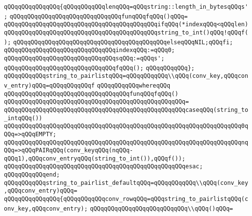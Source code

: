 \verb|qQQqqQQqqQQqqQQq{qQQqqQQqqQQqlenqQQq=qQQqstring::length_in_bytesqQQqs';|\newline
\verb|qQQqqQQqqQQqqQQqqQQqqQQqqQQqqQQqfunqQQqfqQQq()qQQq=|\newline
\verb|qQQqqQQqqQQqqQQqqQQqqQQqqQQqqQQqqQQqqQQqqQQqifqQQq(*indexqQQq<qQQqlen)|\newline
\verb|qQQqqQQqqQQqqQQqqQQqqQQqqQQqqQQqqQQqqQQqqQQqstring_to_int()qQQq!qQQqf();|\newline
\verb|qQQqqQQqqQQqqQQqqQQqqQQqqQQqqQQqqQQqqQQqqQQqelseqQQqNIL;qQQqfi;|\newline
\verb|qQQqqQQqqQQqqQQqqQQqqQQqqQQqqQQqindexqQQq:=qQQq0;|\newline
\verb|qQQqqQQqqQQqqQQqqQQqqQQqqQQqqQQqsqQQq:=qQQqs';|\newline
\verb|qQQqqQQqqQQqqQQqqQQqqQQqqQQqqQQqfqQQq();|\newline
\verb|qQQqqQQqqQQq};|\newline
\newline
\verb|qQQqqQQqqQQqstring_to_pairlistqQQq=qQQqqQQqqQQq\\qQQq(conv_key,qQQqconv_entry)qQQq=qQQqqQQqqQQqf|\newline
\verb|qQQqqQQqqQQqwhereqQQq|\newline
\verb|qQQqqQQqqQQqqQQqqQQqqQQqqQQqqQQqqQQqfunqQQqfqQQq()|\newline
\verb|qQQqqQQqqQQqqQQqqQQqqQQqqQQqqQQqqQQqqQQqqQQqqQQqqQQq=|\newline
\verb|qQQqqQQqqQQqqQQqqQQqqQQqqQQqqQQqqQQqqQQqqQQqqQQqqQQqcaseqQQq(string_to_intqQQq())|\newline
\verb|qQQqqQQqqQQqqQQqqQQqqQQqqQQqqQQqqQQqqQQqqQQqqQQqqQQqqQQqqQQqqQQqqQQq0qQQq=>qQQqEMPTY;|\newline
\verb|qQQqqQQqqQQqqQQqqQQqqQQqqQQqqQQqqQQqqQQqqQQqqQQqqQQqqQQqqQQqqQQqqQQqnqQQq=>qQQqPAIRqQQq(conv_keyqQQq(nqQQq-qQQq1),qQQqconv_entryqQQq(string_to_int()),qQQqf());|\newline
\verb|qQQqqQQqqQQqqQQqqQQqqQQqqQQqqQQqqQQqqQQqqQQqqQQqqQQqesac;|\newline
\verb|qQQqqQQqqQQqend;|\newline
\newline
\verb|qQQqqQQqqQQqstring_to_pairlist_defaultqQQq=qQQqqQQqqQQq\\qQQq(conv_key,qQQqconv_entry)qQQq=|\newline
\verb|qQQqqQQqqQQqqQQq{qQQqqQQqqQQqconv_rowqQQq=qQQqstring_to_pairlistqQQq(conv_key,qQQqconv_entry);|\newline
\verb|qQQqqQQqqQQqqQQqqQQqqQQqqQQq\\qQQq()qQQq=|\newline
